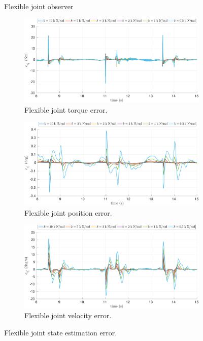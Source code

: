 \begin{figure}[!p]
    \begin{myframe}{Flexible joint observer}
    \centering
        \begin{subfigure}[b]{0.8\textwidth}
        \centering
        \includegraphics[width=\columnwidth]{chapter_flexible_joints/figures/estimation_left_tau_flex_1.pdf}
        \caption{Flexible joint torque error.\label{fig:flex_joint_trq_error}}
    \end{subfigure}
    \hfill
    \begin{subfigure}[b]{0.8\textwidth}
        \centering
        \includegraphics[width=\columnwidth]{chapter_flexible_joints/figures/estimation_left_q_flex_1.pdf}
        \caption{Flexible joint position error.\label{fig:flex_joint_pos_error}}
    \end{subfigure}
     \begin{subfigure}[b]{0.8\textwidth}
        \centering
        \includegraphics[width=\columnwidth]{chapter_flexible_joints/figures/estimation_left_dq_flex_1.pdf}
        \caption{Flexible joint velocity error.\label{fig:flex_joint_vel_error}}
    \end{subfigure}
    \end{myframe}
    \caption{Flexible joint state estimation error.\label{fig:estimation_flex_1}}
\end{figure}
